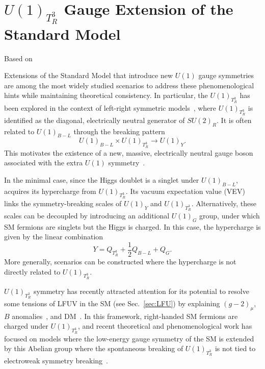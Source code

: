 \chapter{$U(1)_{T^3_R}$ Gauge Extension of the Standard Model}\label{ch:U1T3R}
\hfill{Based on~\parencite{Qureshi:2024naw}}

Extensions of the Standard Model that introduce new $U(1)$ gauge symmetries are among the most widely studied scenarios to address these phenomenological hints while maintaining theoretical consistency. In particular, the $U(1)_{T^3_R}$ has been explored in the context of left-right symmetric models~\parencite{Assad:2017iib, MohapatraPati1975, SenjanovicMohapatra1975}, where $U(1)_{T^3_R}$ is identified as the diagonal, electrically neutral generator of $SU(2)_R$. It is often related to $U(1)_{B-L}$ through the breaking pattern
\[
U(1)_{B-L} \times U(1)_{T^3_R} \rightarrow U(1)_Y.
\]
This motivates the existence of a new, massive, electrically neutral gauge boson associated with the extra $U(1)$ symmetry~\parencite{DiLuzio2018, Baker2019, Michaels:2020fzj, Dev:2021otb}. 

In the minimal case, since the Higgs doublet is a singlet under $U(1)_{B-L}$, acquires its hypercharge from $U(1)_{T^3_R}$. Its vacuum expectation value (VEV) links the symmetry-breaking scales of $U(1)_Y$ and $U(1)_{T^3_R}$. Alternatively, these scales can be decoupled by introducing an additional $U(1)_G$ group, under which SM fermions are singlets but the Higgs is charged. In this case, the hypercharge is given by the linear combination
\begin{equation}
Y=Q_{T^3_R}+\frac{1}{2}Q_{B-L} + Q_G.
\end{equation}
More generally, scenarios can be constructed where the hypercharge is not directly related to $U(1)_{T^3_R}$.

$U(1)_{T^3_R}$ symmetry has recently attracted attention for its potential to resolve some tensions of LFUV in the SM (see Sec.~\ref{sec:LFU}) by explaining $(g-2)_\mu$, $B$ anomalies~\parencite{Dutta2022}, and DM~\cite{Dutta2019, Dutta2020b, Dutta:2022qvn}. In this framework, right-handed SM fermions are charged under $U(1)_{T^3_R}$, and recent theoretical and phenomenological work has focused on models where the low-energy gauge symmetry of the SM is extended by this Abelian group where the spontaneous breaking of $U(1)_{T^3_R}$ is not tied to electroweak symmetry breaking~\parencite{Dutta2019, Dutta2020, Dutta2020b, Dutta2022, Dutta:2022qvn, PhysRevD.107.095019, Dutta2023}.

